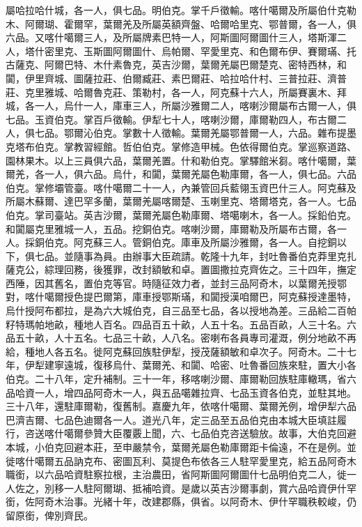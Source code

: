 \begin{pinyinscope}
屬哈拉哈什城，各一人，俱七品。明伯克。掌千戶徵輸。喀什噶爾及所屬伯什克勒木、阿爾瑚、霍爾罕，葉爾羌及所屬英額齊盤、哈爾哈里克、鄂普爾，各一人，俱六品。又喀什噶爾三人，及所屬牌素巴特一人，阿斯圖阿爾圖什三人，塔斯渾二人，塔什密里克、玉斯圖阿爾圖什、烏帕爾、罕愛里克、和色爾布伊、賽爾璊、托古薩克、阿爾巴特、木什素魯克，英吉沙爾，葉爾羌屬巴爾楚克、密特西林，和闐，伊里齊城、圖薩拉莊、伯爾臧莊、素巴爾莊、哈拉哈什村、三普拉莊、濟普莊、克里雅城、哈爾魯克莊、策勒村，各一人，阿克蘇十六人，所屬賽裏木、拜城，各一人，烏什一人，庫車三人，所屬沙雅爾二人，喀喇沙爾屬布古爾一人，俱七品。玉資伯克。掌百戶徵輸。伊犁七十人，喀喇沙爾，庫爾勒四人，布古爾二人，俱七品。鄂爾沁伯克。掌數十人徵輸。葉爾羌屬鄂普爾一人，六品。雜布提墨克塔布伯克。掌教習經館。哲伯伯克。掌修造甲械。色依得爾伯克。掌巡察道路、園林果木。以上三員俱六品，葉爾羌置。什和勒伯克。掌驛館米芻。喀什噶爾，葉爾羌，各一人，俱六品。烏什，和闐，葉爾羌屬色勒庫爾，各一人，俱七品。六品伯克。掌修壩管臺。喀什噶爾二十一人，內兼管回兵藍翎玉資巴什三人。阿克蘇及所屬木蘇爾、達巴罕多蘭，葉爾羌屬喀爾楚、玉喇里克、塔爾塔克，各一人。七品伯克。掌司臺站。英吉沙爾，葉爾羌屬色勒庫爾、塔噶喇木，各一人。採鉛伯克。和闐屬克里雅城一人，五品。挖銅伯克。喀喇沙爾，庫爾勒及所屬布古爾，各一人。採銅伯克。阿克蘇三人。管銅伯克。庫車及所屬沙雅爾，各一人。自挖銅以下，俱七品。並隨事為員。由辦事大臣疏請。乾隆十九年，封吐魯番伯克莽里克扎薩克公，綜理回務，後獲罪，改封額敏和卓。置圖撒拉克齊佐之。三十四年，撫定西陲，因其舊名，置伯克等官。時隨征效力者，並封三品阿奇木，以葉爾羌授鄂對，喀什噶爾授色提巴爾第，庫車授鄂斯璊，和闐授漢咱爾巴，阿克蘇授達墨特，烏什授阿布都拉，是為六大城伯克，自三品至七品，各以授地為差。三品給二百帕籽特瑪帕地畝，種地人百名。四品百五十畝，人五十名。五品百畝，人三十名。六品五十畝，人十五名。七品三十畝，人八名。密喇布各員專司灌溉，例分地畝不再給，種地人各五名。徙阿克蘇回族駐伊犁，授茂薩額敏和卓次子。阿奇木。二十七年，伊犁建寧遠城，復移烏什、葉爾羌、和闐、哈密、吐魯番回族來駐，置大小各伯克。二十八年，定升補制。三十一年，移喀喇沙爾、庫爾勒回族駐庫轍瑪，省六品哈資一人，增四品阿奇木一人，與五品噶雜拉齊、七品玉資各伯克，並駐其地。三十八年，還駐庫爾勒，復舊制。嘉慶九年，依喀什噶爾、葉爾羌例，增伊犁六品巴濟吉爾、七品色迪爾各一人。道光八年，定三品至五品伯克由本城大臣填註履行，咨送喀什噶爾參贊大臣覆覈上聞，六、七品伯克咨送驗放。故事，大伯克回避本城，小伯克回避本莊，至申嚴禁令，葉爾羌屬色勒庫爾距卡倫遠，不在是例。並徙喀什噶爾五品訥克布、密圖瓦利、莫提色布依各三人駐罕愛里克，給五品阿奇木職銜，以六品哈資駐察拉根，主治農田，省阿斯圖阿爾圖什七品明伯克二人，徙一人佐之，別移一人駐阿爾瑚、抵補哈資。是歲以英吉沙爾事劇，賞六品哈資伊什罕銜，佐阿奇木治事。光緒十年，改建郡縣，俱省。以阿奇木、伊什罕職秩較峻，仍留原銜，俾別齊民。


\end{pinyinscope}
